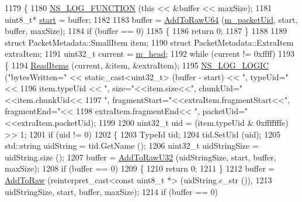 \begin{DoxyCode}
1179 \{
1180   \hyperlink{log-macros-disabled_8h_a90b90d5bad1f39cb1b64923ea94c0761}{NS\_LOG\_FUNCTION} (\textcolor{keyword}{this} << &buffer << maxSize);
1181   uint8\_t* \hyperlink{namespacevisualizer_1_1core_a2a35e5d8a34af358b508dac8635754e0}{start} = buffer;
1182 
1183   buffer = \hyperlink{classns3_1_1PacketMetadata_af872909b61feca47e71738b83a125b86}{AddToRawU64} (\hyperlink{classns3_1_1PacketMetadata_ad97fbc08482c155bc4c11fdff820be86}{m\_packetUid}, start, buffer, maxSize);
1184   \textcolor{keywordflow}{if} (buffer == 0) 
1185     \{
1186       \textcolor{keywordflow}{return} 0;
1187     \}
1188 
1189   \textcolor{keyword}{struct }PacketMetadata::SmallItem item;
1190   \textcolor{keyword}{struct }PacketMetadata::ExtraItem extraItem;
1191   uint32\_t current = \hyperlink{classns3_1_1PacketMetadata_a46b3ef0a9a80a798ad1e81b5694a5658}{m\_head};
1192   \textcolor{keywordflow}{while} (current != 0xffff)
1193     \{
1194       \hyperlink{classns3_1_1PacketMetadata_a3719ad2c32313a9a1c74462322e8b517}{ReadItems} (current, &item, &extraItem);
1195       \hyperlink{group__logging_ga88acd260151caf2db9c0fc84997f45ce}{NS\_LOG\_LOGIC} (\textcolor{stringliteral}{"bytesWritten="} << static\_cast<uint32\_t> (buffer - start) << \textcolor{stringliteral}{", typeUid="}<<
1196                     item.typeUid << \textcolor{stringliteral}{", size="}<<item.size<<\textcolor{stringliteral}{", chunkUid="}<<item.chunkUid<<
1197                     \textcolor{stringliteral}{", fragmentStart="}<<extraItem.fragmentStart<<\textcolor{stringliteral}{", fragmentEnd="}<<
1198                     extraItem.fragmentEnd<< \textcolor{stringliteral}{", packetUid="}<<extraItem.packetUid);
1199 
1200       uint32\_t uid = (item.typeUid & 0xfffffffe) >> 1;
1201       \textcolor{keywordflow}{if} (uid != 0)
1202         \{
1203           TypeId tid;
1204           tid.SetUid (uid);
1205           std::string uidString = tid.GetName ();
1206           uint32\_t uidStringSize = uidString.size ();
1207           buffer = \hyperlink{classns3_1_1PacketMetadata_a5ae4821ac2aae1d62c02243cdd27572a}{AddToRawU32} (uidStringSize, start, buffer, maxSize);
1208           \textcolor{keywordflow}{if} (buffer == 0) 
1209             \{
1210               \textcolor{keywordflow}{return} 0;
1211             \}
1212           buffer = \hyperlink{classns3_1_1PacketMetadata_add5d8a1457ffc3eb6f3453c2ec924726}{AddToRaw} (reinterpret\_cast<const uint8\_t *> (uidString.c\_str ()), 
1213                              uidStringSize, start, buffer, maxSize);
1214           \textcolor{keywordflow}{if} (buffer == 0) 

\end{DoxyCode}
